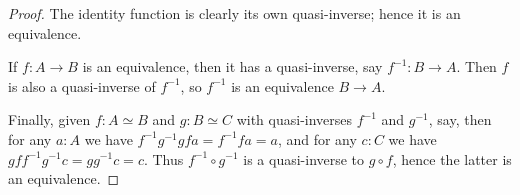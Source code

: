 \documentclass[10pt,a4paper]{article}
\newcommand{\eqv}[2]{\ensuremath{#1 \simeq #2}\xspace}
\theoremstyle{definition}
\theoremstyle{remark}
\numberwithin{equation}{section}
\begin{document}
\begin{proof}
  The identity function is clearly its own quasi-inverse; hence it is an equivalence.

  If $f:A\to B$ is an equivalence, then it has a quasi-inverse, say $f^{-1}:B\to A$.
  Then $f$ is also a quasi-inverse of $f^{-1}$, so $f^{-1}$ is an equivalence $B\to A$.

  Finally, given $f:\eqv A B$ and $g:\eqv B C$ with quasi-inverses $f^{-1}$ and $g^{-1}$, say, then for any $a:A$ we have $f^{-1} g^{-1} g f a = f^{-1} f a = a$, and for any $c:C$ we have $g f f^{-1} g^{-1} c = g g^{-1} c = c$.
  Thus $f^{-1} \circ g^{-1}$ is a quasi-inverse to $g\circ f$, hence the latter is an equivalence.
\end{proof}
\end{document}
